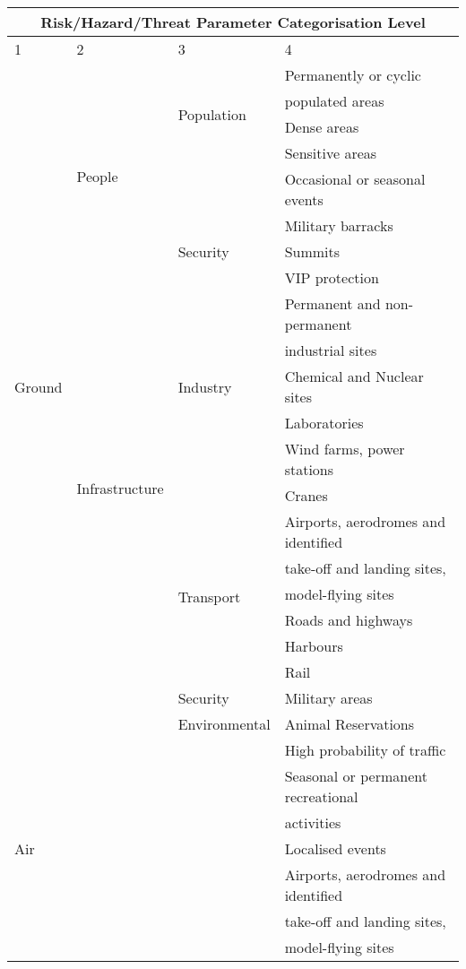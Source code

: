 \documentclass{ua_wgs_base}
\begin{document}
\begin{table}[tbh]
\small
\ttfamily
\begin{centering}
\begin{longtable}{|l|l|l|l|}
 \hline
 \multicolumn{4}{|c|}{Risk/Hazard/Threat Parameter Categorisation Level} \\
 \hline
 1 & 2 & 3 & 4 \\
 \hline
 \multirow{21}{3em}{Ground} & \multirow{8}{7em}{People}  & \multirow{4}{5em}{Population} & Permanently or cyclic \\
  & & & populated areas \\\cline{4-4}
  & & & Dense areas \\\cline{4-4}
  & & & Sensitive areas \\\cline{4-4}
  & & & Occasional or seasonal events \\\cline{3-4}
  & & \multirow{3}{5em}{Security} & Military barracks \\
  & & & Summits \\
  & & & VIP protection \\\cline{2-4}
  & \multirow{12}{5em}{Infrastructure} & \multirow{5}{3em}{Industry} & Permanent and non-permanent \\
  & & & industrial sites \\\cline{4-4}
  & & & Chemical and Nuclear sites \\\cline{4-4}
  & & & Laboratories \\\cline{4-4}
  & & & Wind farms, power stations \\\cline{4-4}
  & & & Cranes \\\cline{3-4}
  & & \multirow{6}{5em}{Transport} & Airports, aerodromes and identified \\
  & & & take-off and landing sites, \\
  & & & model-flying sites \\\cline{4-4}
  & & & Roads and highways \\\cline{4-4}
  & & & Harbours \\\cline{4-4}
  & & & Rail \\\cline{3-4}
  & & Security & Military areas \\\cline{3-4}
  & & Environmental & Animal Reservations \\\cline{1-4}
 \multirow{7}{3em}{Air} & & & High probability of traffic \\\cline{4-4}
  & & & Seasonal or permanent recreational \\
  & & & activities \\\cline{4-4}
  & & & Localised events \\\cline{4-4}
  & & & Airports, aerodromes and identified  \\
  & & & take-off and landing sites,  \\
  & & & model-flying sites \\

\hline
\end{longtable}
\end{centering}
\end{table}
\end{document}
